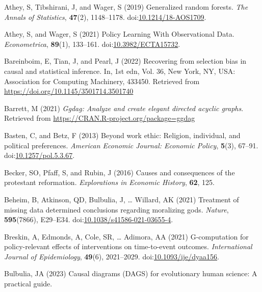 \documentclass[
  singlecolumn,
  9pt]{article}
\newlength{\cslentryspacing}
\begin{document}
\label{refs}
\setlength{\cslentryspacing}{0em}
\begin{CSLReferences}
Athey, S, Tibshirani, J, and Wager, S (2019) Generalized random forests.
\emph{The Annals of Statistics}, \textbf{47}(2), 1148--1178.
doi:\href{https://doi.org/10.1214/18-AOS1709}{10.1214/18-AOS1709}.

Athey, S, and Wager, S (2021) Policy Learning With Observational Data.
\emph{Econometrica}, \textbf{89}(1), 133--161.
doi:\href{https://doi.org/10.3982/ECTA15732}{10.3982/ECTA15732}.

Bareinboim, E, Tian, J, and Pearl, J (2022) Recovering from selection
bias in causal and statistical inference. In, 1st edn, Vol. 36, New
York, NY, USA: Association for Computing Machinery, 433450. Retrieved
from \url{https://doi.org/10.1145/3501714.3501740}

Barrett, M (2021) \emph{Ggdag: Analyze and create elegant directed
acyclic graphs}. Retrieved from
\url{https://CRAN.R-project.org/package=ggdag}

Basten, C, and Betz, F (2013) Beyond work ethic: Religion, individual,
and political preferences. \emph{American Economic Journal: Economic
Policy}, \textbf{5}(3), 67--91.
doi:\href{https://doi.org/10.1257/pol.5.3.67}{10.1257/pol.5.3.67}.

Becker, SO, Pfaff, S, and Rubin, J (2016) Causes and consequences of the
protestant reformation. \emph{Explorations in Economic History},
\textbf{62}, 125.

Beheim, B, Atkinson, QD, Bulbulia, J, \ldots{} Willard, AK (2021)
Treatment of missing data determined conclusions regarding moralizing
gods. \emph{Nature}, \textbf{595}(7866), E29--E34.
doi:\href{https://doi.org/10.1038/s41586-021-03655-4}{10.1038/s41586-021-03655-4}.

Breskin, A, Edmonds, A, Cole, SR, \ldots{} Adimora, AA (2021)
G-computation for policy-relevant effects of interventions on
time-to-event outcomes. \emph{International Journal of Epidemiology},
\textbf{49}(6), 2021--2029.
doi:\href{https://doi.org/10.1093/ije/dyaa156}{10.1093/ije/dyaa156}.

Bulbulia, JA (2023) Causal diagrams (DAGS) for evolutionary human
science: A practical guide.


\end{CSLReferences}
\end{document}
